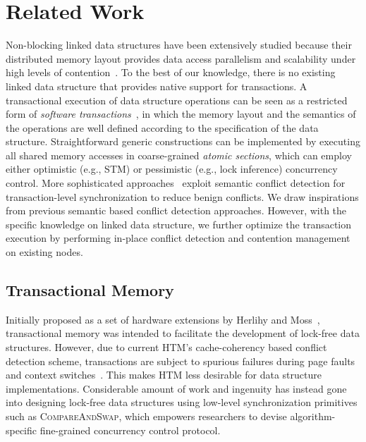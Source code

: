 \documentclass[]{sig-alternate-05-2015}
\begin{document}
\section{Related Work}
\label{sec:related}
Non-blocking linked data structures have been extensively studied because their distributed memory layout provides data access parallelism and scalability under high levels of contention~\cite{harris2001pragmatic,linden2013skiplist,zhang2015lockfree,michael2002high}.
To the best of our knowledge, there is no existing linked data structure that provides native support for transactions.
A transactional execution of data structure operations can be seen as a restricted form of \emph{software transactions}~\cite{harris2010transactional}, in which the memory layout and the semantics of the operations are well defined according to the specification of the data structure. 
Straightforward generic constructions can be implemented by executing all shared memory accesses in coarse-grained \emph{atomic sections}, which can employ either optimistic (e.g., STM) or pessimistic (e.g., lock inference) concurrency control.
More sophisticated approaches~\cite{bronson2010transactional,herlihy2008transactional,golan2015automatic} exploit semantic conflict detection for transaction-level synchronization to reduce benign conflicts.
We draw inspirations from previous semantic based conflict detection approaches.
However, with the specific knowledge on linked data structure, we further optimize the transaction execution by performing in-place conflict detection and contention management on existing nodes.

\subsection{Transactional Memory}
Initially proposed as a set of hardware extensions by Herlihy and Moss~\cite{herlihy1993transactional}, transactional memory was intended to facilitate the development of lock-free data structures.
However, due to current HTM's cache-coherency based conflict detection scheme, transactions are subject to spurious failures during page faults and context switches~\cite{dice2009early}.
This makes HTM less desirable for data structure implementations.
Considerable amount of work and ingenuity has instead gone into designing lock-free data structures using low-level synchronization primitives such as \textsc{CompareAndSwap}, which empowers researchers to devise algorithm-specific fine-grained concurrency control protocol.
\end{document}
